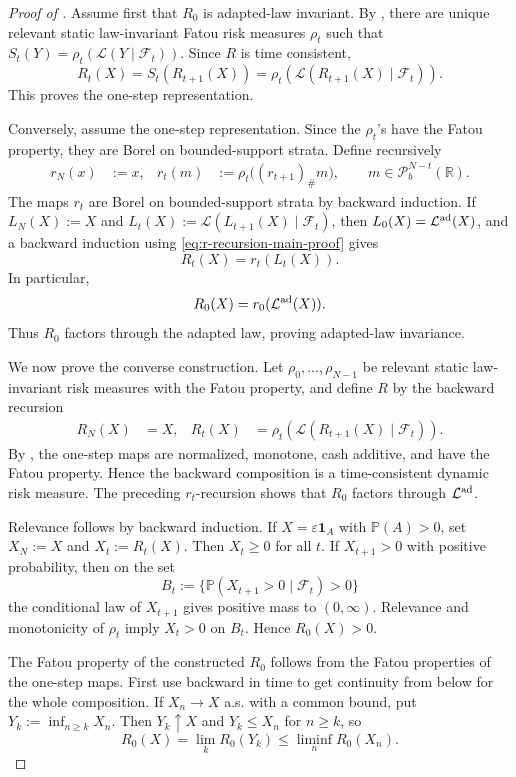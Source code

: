 \documentclass[a4paper]{amsart}
\theoremstyle{definition}
\newcommand{\R}{\mathbb{R}}
\newcommand{\F}{\mathcal{F}}
\newcommand{\law}{\mathcal{L}}
\newcommand{\Pc}{\mathcal P}
\renewcommand{\P}{\mathbb{P}}
\newcommand{\lawad}{\law^{\textup{ad}}}
\begin{document}
\begin{proof}[Proof of ]
Assume first that \(R_0\) is adapted-law invariant. By
, there are unique relevant static law-invariant
Fatou risk measures \(\rho_t\) such that
\(S_t(Y)=\rho_t(\law(Y\mid\F_t))\). Since \(R\) is time consistent,
\[
R_t(X)=S_t(R_{t+1}(X))
=
\rho_t(\law(R_{t+1}(X)\mid\F_t)).
\]
This proves the one-step representation.

Conversely, assume the one-step representation. Since the \(\rho_t\)'s have
the Fatou property, they are Borel on bounded-support strata. Define
recursively
\begin{align}
r_N(x)&:=x,
&
r_t(m)&:=\rho_t\big((r_{t+1})_\#m\big),
\qquad m\in\Pc_b^{N-t}(\R).
\label{eq:r-recursion-main-proof}
\end{align}
The maps \(r_t\) are Borel on bounded-support strata by backward induction.
If \(L_N(X):=X\) and \(L_t(X):=\law(L_{t+1}(X)\mid\F_t)\), then
\(L_0(X)=\lawad(X)\), and a backward induction using
\eqref{eq:r-recursion-main-proof} gives
\[
R_t(X)=r_t(L_t(X)).
\]
In particular,
\[
R_0(X)=r_0(\lawad(X)).
\]
Thus \(R_0\) factors through the adapted law, proving adapted-law invariance.

We now prove the converse construction. Let
\(\rho_0,\dots,\rho_{N-1}\) be relevant static law-invariant risk measures with
the Fatou property, and define \(R\) by the backward recursion
\begin{align}
R_N(X)&=X,
&
R_t(X)&=\rho_t(\law(R_{t+1}(X)\mid\F_t)).
\label{eq:constructed-backward-recursion}
\end{align}
By , the one-step maps are normalized,
monotone, cash additive, and have the Fatou property. Hence the backward
composition is a time-consistent dynamic risk measure. The preceding
\(r_t\)-recursion shows that \(R_0\) factors through \(\lawad\).

Relevance follows by backward induction. If \(X=\varepsilon\mathbf 1_A\) with
\(\P(A)>0\), set \(X_N:=X\) and \(X_t:=R_t(X)\). Then \(X_t\ge0\) for all
\(t\). If \(X_{t+1}>0\) with positive probability, then on the set
\[
B_t:=\{\P(X_{t+1}>0\mid\F_t)>0\}
\]
the conditional law of \(X_{t+1}\) gives positive mass to \((0,\infty)\).
Relevance and monotonicity of \(\rho_t\) imply \(X_t>0\) on \(B_t\). Hence
\(R_0(X)>0\).

The Fatou property of the constructed \(R_0\) follows from the Fatou
properties of the one-step maps. First use
 backward in time to get continuity from
below for the whole composition. If \(X_n\to X\) a.s. with a common bound, put
\(Y_k:=\inf_{n\ge k}X_n\). Then \(Y_k\uparrow X\) and \(Y_k\le X_n\) for
\(n\ge k\), so
\[
R_0(X)=\lim_kR_0(Y_k)\le\liminf_n R_0(X_n).
\]


\end{proof}
\end{document}
